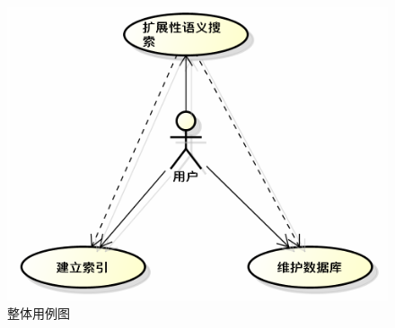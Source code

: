 \documentclass[12pt,a4paper]{article}
\begin{document}
	\begin{figure}[htbp] 
	\centering\includegraphics[scale=0.5]{fig/SystemUseCase.png} 
	\caption{整体用例图}\label{fig:整体用例图} 
	\end{figure} 
	
\end{document}
